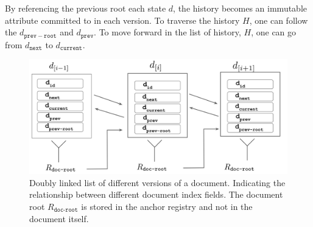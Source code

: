 By referencing the previous root each state $d$, the history becomes an immutable attribute committed to in each version. To traverse the history $H$, one can follow the $d_{\mathtt{prev-root}}$ and $d_{\mathtt{prev}}$. To move forward in the list of history, $H$, one can go from $d_{\mathtt{next}}$ to $d_{\mathtt{current}}$.
\begin{figure}[thpb]
  \centering
  \includegraphics[width=16cm]{img/documents-history-v2.png}
  \caption{Doubly linked list of different versions of a document. Indicating the relationship between different document index fields. The document root $R_{\texttt{doc-root}}$ is stored in the anchor registry and not in the document itself.} 
  \label{fig:documents}
\end{figure}


